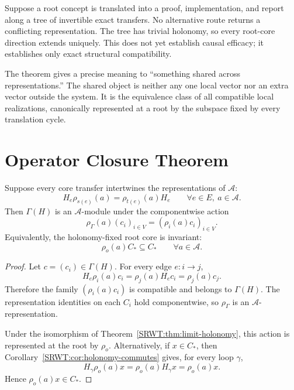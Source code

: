 \begin{SRWTexample}\label{SRWT:ex:tree-workspace}
Suppose a root concept is translated into a proof, implementation, and report
along a tree of invertible exact transfers. No alternative route returns a
conflicting representation. The tree has trivial holonomy, so every root-core
direction extends uniquely. This does not yet establish causal efficacy; it
establishes only exact structural compatibility.
\end{SRWTexample}


The theorem gives a precise meaning to ``something shared across
representations.'' The shared object is neither any one local vector nor an
extra vector outside the system. It is the equivalence class of all compatible
local realizations, canonically represented at a root by the subspace fixed by
every translation cycle.

\section{Operator Closure Theorem}

\begin{SRWTtheorem}\label{SRWT:thm:operator-closure}
Suppose every core transfer intertwines the representations of
\(\mathcal A\):
\[
H_e\rho_{s(e)}(a)=\rho_{t(e)}(a)H_e
\qquad
\forall e\in E,\ a\in\mathcal A.
\]
Then \(\Gamma(H)\) is an \(\mathcal A\)-module under the componentwise action
\[
\rho_\Gamma(a)(c_i)_{i\in V}
=
(\rho_i(a)c_i)_{i\in V}.
\]
Equivalently, the holonomy-fixed root core is invariant:
\[
\boxed{
\rho_o(a)C_*\subseteq C_*
\qquad
\forall a\in\mathcal A.
}
\]
\end{SRWTtheorem}

\begin{proof}
Let \(c=(c_i)\in\Gamma(H)\). For every edge \(e:i\to j\),
\[
H_e\rho_i(a)c_i
=
\rho_j(a)H_ec_i
=
\rho_j(a)c_j.
\]
Therefore the family \((\rho_i(a)c_i)\) is compatible and belongs to
\(\Gamma(H)\). The representation identities on each \(C_i\) hold
componentwise, so \(\rho_\Gamma\) is an \(\mathcal A\)-representation.

Under the isomorphism of Theorem~\ref{SRWT:thm:limit-holonomy}, this action is
represented at the root by \(\rho_o\). Alternatively, if \(x\in C_*\), then
Corollary~\ref{SRWT:cor:holonomy-commutes} gives, for every loop \(\gamma\),
\[
H_\gamma\rho_o(a)x
=
\rho_o(a)H_\gamma x
=
\rho_o(a)x.
\]
Hence \(\rho_o(a)x\in C_*\).
\end{proof}


